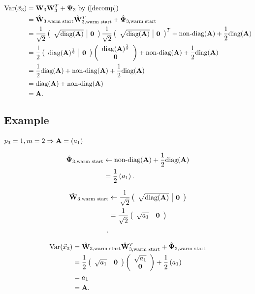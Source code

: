 \begin{align}
  \mathrm{Var}(\vec{x}_3) &= \bold{W}_3 \bold{W}_3^T + \bold{\Psi}_3  \text{ by (\ref{decomp})} \\
             &= \hat{\bold{W}}_{3,\text{warm start}} \hat{\bold{W}}_{3,\text{warm start}}^T + \hat{\bold{\Psi}}_{3, \text{warm start}} \\
  &=\frac{1}{\sqrt{2}} \left( \begin{array}{c|c} \sqrt{ \text{diag}(\bold{A}) } & \bold{0} \end{array} \right) \frac{1}{\sqrt{2}} \left( \begin{array}{c|c} \sqrt{ \text{diag}(\bold{A}) } & \bold{0} \end{array} \right)^T + \text{non-diag}(\bold{A}) + \frac{1}{2} \text{diag}(\bold{A}) \\
&=  \frac{1}{2} \left( \begin{array}{c|c}  \text{diag}(\bold{A})
    ^{\frac{1}{2}} & \bold{0}  \end{array} \right) \left( \begin{array}{c}  \text{diag}(\bold{A})
    ^{\frac{1}{2}}\\  \bold{0}  \end{array} \right) +
  \text{non-diag}(\bold{A}) + \frac{1}{2} \text{diag}(\bold{A}) \\
             &= \frac{1}{2} \text{diag}(\bold{A}) + \text{non-diag}(\bold{A}) + \frac{1}{2} \text{diag}(\bold{A}) \\
             &= \text{diag}(\bold{A}) + \text{non-diag}(\bold{A}) \\
               &= \bold{A}
.\end{align}


\subsection{Example}
$p_3 = 1, m = 2 \Rightarrow \bold{A} = \left(a_1 \right)$

\begin{align}
  \hat{\bold{\Psi}}_{3, \text{warm start}} &\leftarrow \text{non-diag}(\bold{A}) + \frac{1}{2} \text{diag}(\bold{A})\\
  &= \frac{1}{2} \left(a_1 \right)
.\end{align}

\begin{align}
  \hat{\bold{W}}_{3,\text{warm start}} &\leftarrow \frac{1}{\sqrt{2}} \left( \begin{array}{c|c} \sqrt{ \text{diag}(\bold{A}) } & \bold{0} \end{array} \right) \\
  &= \frac{1}{\sqrt{2}}  \left( \begin{array}{cc} \sqrt{a_1}  &
                                                                 \mathbf{0} \end{array}
                                                                \right) \\ 
.\end{align}

\begin{align}
  \mathrm{Var}(\vec{x}_3) &= \hat{\bold{W}}_{3,\text{warm start}} \hat{\bold{W}}_{3,\text{warm start}}^T + \hat{\bold{\Psi}}_{3, \text{warm start}} \\
  &= \frac{1}{2}  \left( \begin{array}{cc} \sqrt{a_1}  &
                                                                 \mathbf{0} \end{array}
                                                                \right)
                                                                \left(\begin{array}{c}
                                                                       \sqrt{a_1}
                                                                       \\
                                                                       \mathbf{0} \end{array} \right)
  + \frac{1}{2} \left( a_1 \right) \\
  &= a_1 \\
&= \bold{A}
.\end{align}



